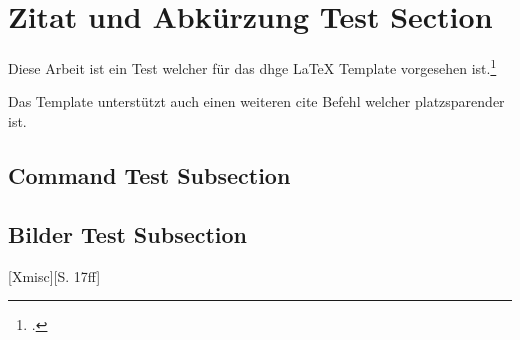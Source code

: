 \section{Zitat und Abkürzung Test Section}

Diese Arbeit ist ein Test welcher f\"ur das \ac{dhge} LaTeX Template vorgesehen ist.\footcite{Xmisc}

Das Template unterstützt auch einen weiteren cite Befehl welcher platzsparender ist.\supercite{Xmisc}

\cleardoublepage

\subsection{Command Test Subsection}

\doubleunderline{$150\mathrm{\Omega}$}

\subsection{Bilder Test Subsection}

[Xmisc][S. 17ff]
